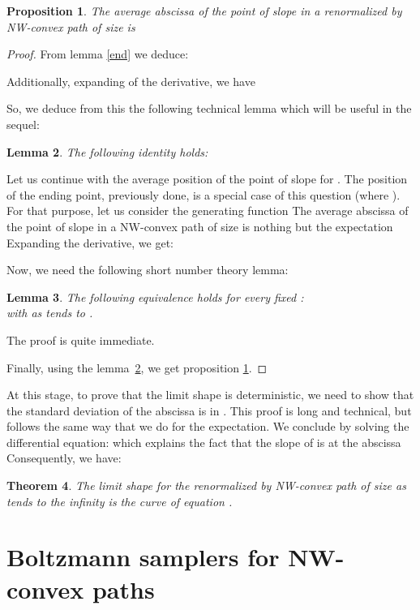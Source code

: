 \documentclass{article}
\newtheorem{theorem}{Theorem}[section]
\newtheorem{lemma}[theorem]{Lemma}
\newtheorem{proposition}[theorem]{Proposition}
\begin{document}
\begin{proposition}
\label{prop:abs}
The average abscissa of the point of slope  in a renormalized by  
NW-convex path of size  is 
\end{proposition}
\begin{proof}
From lemma \ref{end} we deduce:

Additionally, expanding of the derivative, we have 


So, we deduce from this the following technical lemma which will be useful in the sequel:
\begin{lemma}\label{useful} The following identity holds:

\end{lemma}

Let us continue with the average position of the point of slope  for . The position of the ending point, previously done, is a special case of this question (where ).
For that purpose, let us consider the generating function  The average abscissa of the point of slope  in a NW-convex path of size  is nothing but the expectation  Expanding the derivative, we get:

Now, we need the following short number theory lemma:
\begin{lemma} The following equivalence holds for every fixed :\\ 
 with  as  tends to .
\end{lemma}
The proof is quite immediate. 

Finally, using the lemma~\ref{useful}, we get proposition \ref{prop:abs}.
\end{proof}

At this stage, to prove that the limit shape is deterministic, we need to show that the standard deviation of the abscissa is in . 
This proof is long and technical, but follows the same way that we do for the expectation.
We conclude by solving the differential equation:
  which explains the fact that the slope of  is  at the abscissa  
Consequently, we have:

\begin{theorem}
The limit shape for the renormalized by  NW-convex path of size  as  tends to the infinity is the curve of equation .
\end{theorem}



\section{Boltzmann samplers for NW-convex paths}
\label{section3}
\end{document}
